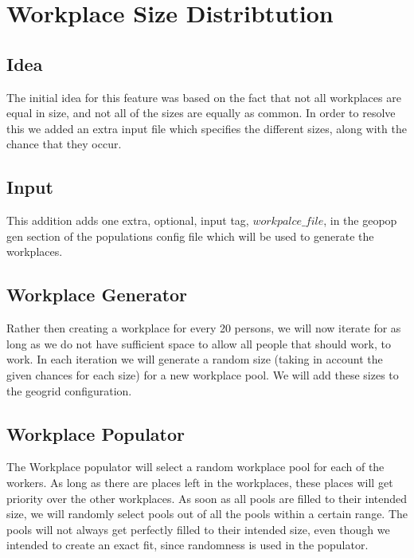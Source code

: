 
\section{Workplace Size Distribtution}
\label{section:WorkplaceSizeDistribution}

\subsection{Idea}
The initial idea for this feature was based on the fact that not all workplaces are equal in size, and not all of the sizes are equally as common. In order to resolve this we added an extra input file which specifies the different sizes, along with the chance that they occur.

\subsection{Input}
This addition adds one extra, optional, input tag, $workpalce\_file$, in the geopop gen section of the populations config file which will be used to generate the workplaces.

\subsection{Workplace Generator}
Rather then creating a workplace for every 20 persons, we will now iterate for as long as we do not have sufficient space to allow all people that should work, to work. In each iteration we will generate a random size (taking in account the given chances for each size) for a new workplace pool. We will add these sizes to the geogrid configuration.

\subsection{Workplace Populator}
The Workplace populator will select a random workplace pool for each of the workers. As long as there are places left in the workplaces, these places will get priority over the other workplaces. As soon as all pools are filled to their intended size, we will randomly select pools out of all the pools within a certain range. The pools will not always get perfectly filled to their intended size, even though we intended to create an exact fit, since randomness is used in the populator.

